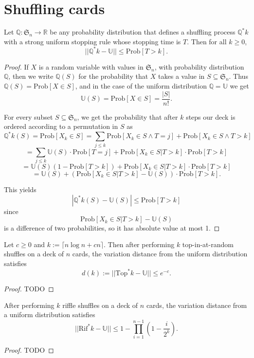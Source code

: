 \chapter{Shuffling cards}
\begin{lemma}
  \label{ch31lemma}
Let $\mathbb{Q} : \mathfrak{S}_n \longrightarrow \mathbb{R}$ be any probability distribution
that defines a shuffling process $\mathbb{Q}^*k$ with a strong uniform stopping rule
whose stopping time is $T$. Then for all $k \geq 0$,
\[
||\mathbb{Q}^*k - \mathbb{U}|| \leq \text{Prob}[T > k].
\]
\end{lemma}
\begin{proof}
If $X$ is a random variable with values in $\mathfrak{S}_n$, with probability distribution $\mathbb{Q}$, then we write $\mathbb{Q}(S)$ for the probability that $X$ takes a value in $S \subseteq \mathfrak{S}_n$. Thus $\mathbb{Q}(S) = \text{Prob}[X \in S]$, and in the case of the uniform distribution $\mathbb{Q} = \mathbb{U}$ we get
\[
\mathbb{U}(S) = \text{Prob}[X \in S] = \frac{|S|}{n!}.
\]

For every subset $S \subseteq \mathfrak{S}_n$, we get the probability that after $k$ steps our deck is ordered according to a permutation in $S$ as
\[
\mathbb{Q}^*k(S) = \text{Prob}[X_k \in S]
= \sum_{j \leq k} \text{Prob}[X_k \in S \land T = j] + \text{Prob}[X_k \in S \land T > k]
\]
\[
= \sum_{j \leq k} \mathbb{U}(S) \cdot \text{Prob}[T = j] + \text{Prob}[X_k \in S | T > k] \cdot \text{Prob}[T > k]
\]
\[
= \mathbb{U}(S) (1 - \text{Prob}[T > k]) + \text{Prob}[X_k \in S | T > k] \cdot \text{Prob}[T > k]
\]
\[
= \mathbb{U}(S) + (\text{Prob}[X_k \in S | T > k] - \mathbb{U}(S)) \cdot \text{Prob}[T > k].
\]

This yields
\[
|\mathbb{Q}^*k(S) - \mathbb{U}(S)| \leq \text{Prob}[T > k]
\]
since
\[
\text{Prob}[X_k \in S | T > k] - \mathbb{U}(S)
\]
is a difference of two probabilities, so it has absolute value at most 1.
\end{proof}


\begin{theorem}
  \label{ch31theorem1}
   Let $c \geq 0$ and $k := \lceil n \log n + cn \rceil$.
   Then after performing $k$ top-in-at-random shuffles on a deck of $n$ cards,
   the variation distance from the uniform distribution satisfies
  \[
  d(k) := ||\text{Top}^*k - \mathbb{U}|| \leq e^{-c}.
  \]
\end{theorem}
\begin{proof}
  TODO
\end{proof}


\begin{theorem}
  \label{ch31theorem2}
  After performing $k$ riffle shuffles on a deck of $n$ cards, the variation distance from a uniform distribution satisfies
\[
||\text{Rif}^*k - \mathbb{U}|| \leq 1 - \prod_{i=1}^{n-1} \left( 1 - \frac{i}{2^k} \right).
\]
\end{theorem}
\begin{proof}
  TODO
\end{proof}
